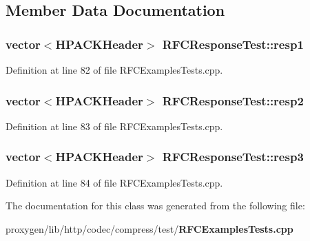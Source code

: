 \subsection{Member Data Documentation}
\subsubsection[{resp1}]{\setlength{\rightskip}{0pt plus 5cm}vector$<${\bf H\+P\+A\+C\+K\+Header}$>$ R\+F\+C\+Response\+Test\+::resp1\hspace{0.3cm}{\ttfamily [protected]}}\label{classRFCResponseTest_a8d1323ca3fcecbf275a815d0e2d79d23}


Definition at line 82 of file R\+F\+C\+Examples\+Tests.\+cpp.

\subsubsection[{resp2}]{\setlength{\rightskip}{0pt plus 5cm}vector$<${\bf H\+P\+A\+C\+K\+Header}$>$ R\+F\+C\+Response\+Test\+::resp2\hspace{0.3cm}{\ttfamily [protected]}}\label{classRFCResponseTest_a913dc42a348c12ebf5522dab6279bddd}


Definition at line 83 of file R\+F\+C\+Examples\+Tests.\+cpp.

\subsubsection[{resp3}]{\setlength{\rightskip}{0pt plus 5cm}vector$<${\bf H\+P\+A\+C\+K\+Header}$>$ R\+F\+C\+Response\+Test\+::resp3\hspace{0.3cm}{\ttfamily [protected]}}\label{classRFCResponseTest_adb948e0aa9cb430a26416932eb48ce7f}


Definition at line 84 of file R\+F\+C\+Examples\+Tests.\+cpp.



The documentation for this class was generated from the following file\+:\begin{DoxyCompactItemize}
\item 
proxygen/lib/http/codec/compress/test/{\bf R\+F\+C\+Examples\+Tests.\+cpp}\end{DoxyCompactItemize}
